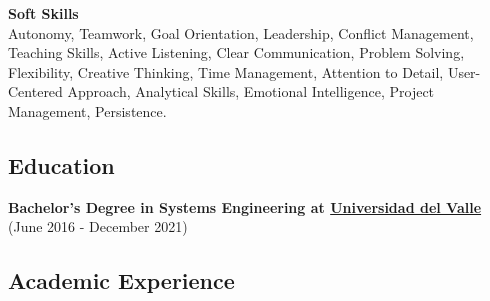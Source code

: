   \vspace*{0.2cm}
  \textbf{Soft Skills}\\
  Autonomy, Teamwork, Goal Orientation, Leadership, Conflict Management, Teaching Skills, Active Listening, Clear Communication, Problem Solving, Flexibility, Creative Thinking, Time Management, Attention to Detail, User-Centered Approach, Analytical Skills, Emotional Intelligence, Project Management, Persistence.
  
  \subsection*{Education}
  \vspace*{0.2cm}
  \textbf{Bachelor's Degree in Systems Engineering at \href{https://www.univalle.edu.co/}{Universidad del Valle}} \hfill (June 2016 - December 2021)

  \noindent\makebox[\linewidth]{\rule{\textwidth}{0.4pt}}

  \subsection*{Academic Experience}
  \vspace*{0.2cm}


